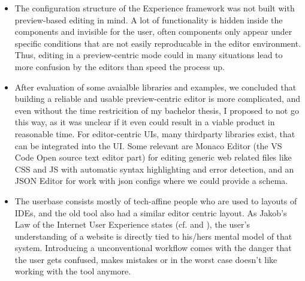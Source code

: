 \begin{itemize}
  \item The configuration structure of the Experience framework was not built with preview-based editing in mind. A lot of functionality is hidden inside the components and invisible for the user,
  often components only appear under specific conditions that are not easily reproducable in the editor environment. Thus, editing in a preview-centric mode could in many situations
  lead to more confusion by the editors than speed the process up.
  \item After evaluation of some avaialble libraries and examples, we concluded that building a reliable and usable preview-centric editor is more complicated, and even without the time restricition of my bachelor thesis, I proposed to not go this way,
  as it was unclear if it even could result in a viable product in reasonable time. For editor-centric UIs, many thirdparty libraries exist, that can be integrated into the UI.
  Some relevant are Monaco Editor (the VS Code Open source text editor part) for editing generic web related files like CSS and JS with automatic syntax highlighting and error detection, and an JSON Editor for work with json configs where we could provide a schema.
  \item The userbase consists mostly of tech-affine people who are used to layouts of IDEs, and the old tool also had a similar editor centric layout.
  As Jakob's Law of the Internet User Experience states (cf. \cite{Nielsen:2000} and \cite[p. 2]{LawsOfUX:2020ys}), the user's understanding of a website is directly tied to his/hers mental model of that system.
  Introducing a unconventional workflow comes with the danger that the user gets confused, makes mistakes or in the worst case doesn't like working with the tool anymore.

\end{itemize}